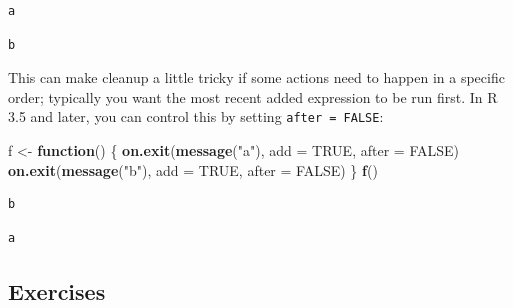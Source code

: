 \documentclass[]{book}
\newenvironment{Shaded}{\begin{snugshade}}{\end{snugshade}}
\newcommand{\KeywordTok}[1]{\textcolor[rgb]{0.13,0.29,0.53}{\textbf{#1}}}
\newcommand{\DataTypeTok}[1]{\textcolor[rgb]{0.13,0.29,0.53}{#1}}
\newcommand{\StringTok}[1]{\textcolor[rgb]{0.31,0.60,0.02}{#1}}
\newcommand{\OtherTok}[1]{\textcolor[rgb]{0.56,0.35,0.01}{#1}}
\newcommand{\ControlFlowTok}[1]{\textcolor[rgb]{0.13,0.29,0.53}{\textbf{#1}}}
\newcommand{\NormalTok}[1]{#1}
\theoremstyle{definition}
\theoremstyle{definition}
\theoremstyle{definition}
\theoremstyle{remark}
\begin{document}
\begin{verbatim}
a
\end{verbatim}

\begin{verbatim}
b
\end{verbatim}

This can make cleanup a little tricky if some actions need to happen in
a specific order; typically you want the most recent added expression to
be run first. In R 3.5 and later, you can control this by setting
\texttt{after\ =\ FALSE}:

\begin{Shaded}
\begin{Highlighting}[]
\NormalTok{f <-}\StringTok{ }\ControlFlowTok{function}\NormalTok{() \{}
  \KeywordTok{on.exit}\NormalTok{(}\KeywordTok{message}\NormalTok{(}\StringTok{"a"}\NormalTok{), }\DataTypeTok{add =} \OtherTok{TRUE}\NormalTok{, }\DataTypeTok{after =} \OtherTok{FALSE}\NormalTok{)}
  \KeywordTok{on.exit}\NormalTok{(}\KeywordTok{message}\NormalTok{(}\StringTok{"b"}\NormalTok{), }\DataTypeTok{add =} \OtherTok{TRUE}\NormalTok{, }\DataTypeTok{after =} \OtherTok{FALSE}\NormalTok{)}
\NormalTok{\}}
\KeywordTok{f}\NormalTok{()}
\end{Highlighting}
\end{Shaded}

\begin{verbatim}
b
\end{verbatim}

\begin{verbatim}
a
\end{verbatim}

\subsection{Exercises}\label{exercises-4}
\end{document}
